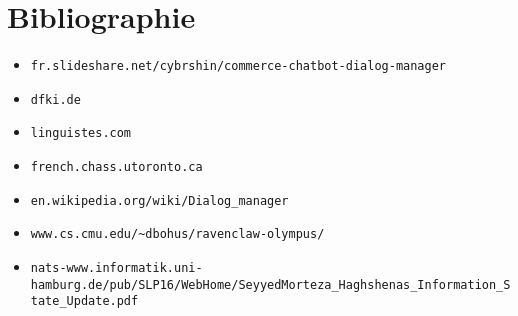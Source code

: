 \documentclass[11pt,dvipsnames,svgnames]{report}
\begin{document}



\newpage

\chapter*{Bibliographie}
\begin{itemize}
	\item \verb|fr.slideshare.net/cybrshin/commerce-chatbot-dialog-manager|
	\item \verb|dfki.de|
	\item \verb|linguistes.com|
	\item \verb|french.chass.utoronto.ca|
	\item \verb|en.wikipedia.org/wiki/Dialog_manager|
	\item \verb|www.cs.cmu.edu/~dbohus/ravenclaw-olympus/|
	\item \verb|nats-www.informatik.uni-hamburg.de/pub/SLP16/WebHome/SeyyedMorteza_Haghshenas_Information_State_Update.pdf|
\end{itemize}


\newpage
\listoffigures{}


\end{document}
